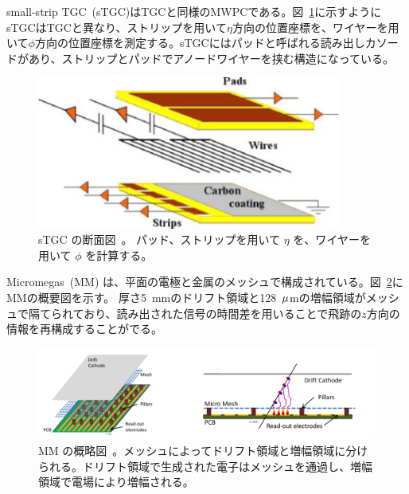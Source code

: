 small-strip TGC~(sTGC)はTGCと同様のMWPCである。図~\ref{fig:sTGC}に示すようにsTGCはTGCと異なり、ストリップを用いて$\eta$方向の位置座標を、ワイヤーを用いて$\phi$方向の位置座標を測定する。sTGCにはパッドと呼ばれる読み出しカソードがあり、ストリップとパッドでアノードワイヤーを挟む構造になっている。

\begin{figure}[tb]
  \centering
  \includegraphics[clip, width=10cm]{fig/2/stgc-structure.pdf}
  \caption{sTGC の断面図~\cite{article:NSW_tech}。 パッド、ストリップを用いて $\eta$ を、ワイヤーを用いて $\phi$ を計算する。}
  \label{fig:sTGC}
\end{figure}

Micromegas~(MM) は、平面の電極と金属のメッシュで構成されている。図~\ref{fig:MM}にMMの概要図を示す。
厚さ5~mmのドリフト領域と128~$\rm{\mu}$mの増幅領域がメッシュで隔てられており、読み出された信号の時間差を用いることで飛跡の$z$方向の情報を再構成することがでる。

\begin{figure}[tb]
  \centering
  \includegraphics[clip, width=13cm]{fig/2/mm-structure.pdf}
  \caption{MM の概略図~\cite{article:NSW_tech}。メッシュによってドリフト領域と増幅領域に分けられる。ドリフト領域で生成された電子はメッシュを通過し、増幅領域で電場により増幅される。}
  \label{fig:MM}
\end{figure}


\newpage
